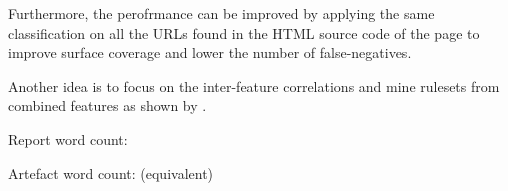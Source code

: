 Furthermore, the perofrmance can be improved by applying the same classification on all the URLs found in the HTML source code of the page to improve surface coverage and lower the number of false-negatives.

Another idea is to focus on the inter-feature correlations and mine rulesets from combined features as shown by \cite{INTELLIGENT_RULE_MINING}.


% 

\clearpage
\vspace*{\fill}
\begin{center}
\begin{minipage}{.6\textwidth}
\centering 
Report word count:

Artefact word count: (equivalent)
\end{minipage}
\end{center}
\vfill
\clearpage


\iffalse
The Conclusions chapter marks the end of the project report and it is a summary which brings together many of the points that you have made in other chapters, especially in the previous chapter. It is usually 2 – 3 pages long with three sections:
\begin{enumerate}
	\item Summary: summarise what you have achieved and restate the main results
	\item Evaluation: evaluate what you have achieved and how well you have met the objectives
	\item Future work: explain any limitations and how things might be improved.]
\end{enumerate}

\noindent
[Word count should be included at the end of the last section. Please look at section 5.2 and 5.3 of the Project Handbook for word count policy.]
\newline
Word count (main body of the report): 
\\
Word count (artefact): 

\fi